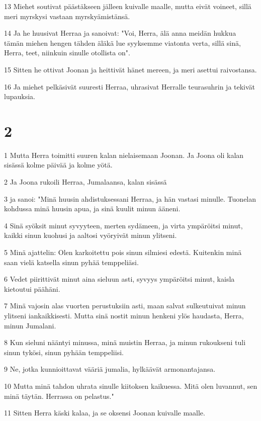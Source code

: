 \par 13 Miehet soutivat päästäkseen jälleen kuivalle maalle, mutta eivät voineet, sillä meri myrskysi vastaan myrskyämistänsä.
\par 14 Ja he huusivat Herraa ja sanoivat: "Voi, Herra, älä anna meidän hukkua tämän miehen hengen tähden äläkä lue syyksemme viatonta verta, sillä sinä, Herra, teet, niinkuin sinulle otollista on".
\par 15 Sitten he ottivat Joonan ja heittivät hänet mereen, ja meri asettui raivostansa.
\par 16 Ja miehet pelkäsivät suuresti Herraa, uhrasivat Herralle teurasuhrin ja tekivät lupauksia.

\chapter{2}

\par 1 Mutta Herra toimitti suuren kalan nielaisemaan Joonan. Ja Joona oli kalan sisässä kolme päivää ja kolme yötä.
\par 2 Ja Joona rukoili Herraa, Jumalaansa, kalan sisässä
\par 3 ja sanoi: "Minä huusin ahdistuksessani Herraa, ja hän vastasi minulle. Tuonelan kohdussa minä huusin apua, ja sinä kuulit minun ääneni.
\par 4 Sinä syöksit minut syvyyteen, merten sydämeen, ja virta ympäröitsi minut, kaikki sinun kuohusi ja aaltosi vyöryivät minun ylitseni.
\par 5 Minä ajattelin: Olen karkoitettu pois sinun silmiesi edestä. Kuitenkin minä saan vielä katsella sinun pyhää temppeliäsi.
\par 6 Vedet piirittivät minut aina sieluun asti, syvyys ympäröitsi minut, kaisla kietoutui päähäni.
\par 7 Minä vajosin alas vuorten perustuksiin asti, maan salvat sulkeutuivat minun ylitseni iankaikkisesti. Mutta sinä nostit minun henkeni ylös haudasta, Herra, minun Jumalani.
\par 8 Kun sieluni nääntyi minussa, minä muistin Herraa, ja minun rukoukseni tuli sinun tykösi, sinun pyhään temppeliisi.
\par 9 Ne, jotka kunnioittavat vääriä jumalia, hylkäävät armonantajansa.
\par 10 Mutta minä tahdon uhrata sinulle kiitoksen kaikuessa. Mitä olen luvannut, sen minä täytän. Herrassa on pelastus."
\par 11 Sitten Herra käski kalaa, ja se oksensi Joonan kuivalle maalle.

